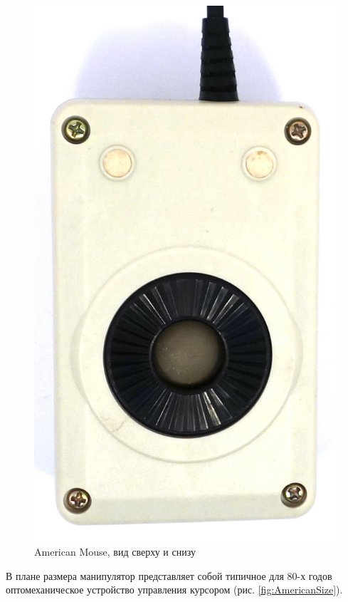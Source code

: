 \documentclass[11pt, a4paper]{article}
\begin{document}
\begin{figure}[h]
    \includegraphics[scale=0.7]{1986_american_mouse/bottom_60.jpg}
    \caption{American Mouse, вид сверху и снизу}
    \label{AmericanTopAndBottom}
\end{figure}

В плане размера манипулятор представляет собой типичное для 80-х годов оптомеханическое устройство управления курсором (рис. \ref{fig:AmericanSize}).
\end{document}

